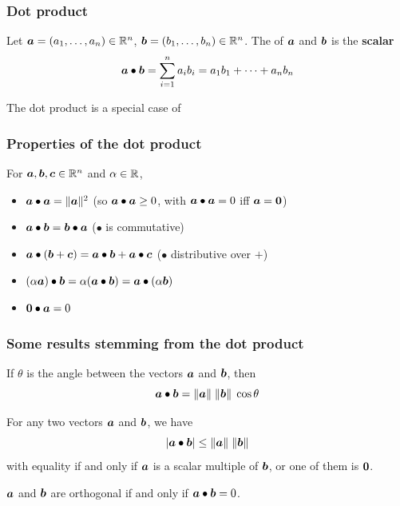 \documentclass[aspectratio=169]{beamer}\usepackage[]{graphicx}\usepackage[]{xcolor}
\begin{document}
\begin{frame}
\frametitle{Dot product}
	\begin{importantdefinition}
		Let $\bm{a}=(a_1,\ldots,a_n)\in \mathbb{R}^n$, $\bm{b}=(b_1,\ldots,b_n)\in\mathbb{R}^n$. 
		The  of $\bm{a}$ and $\bm{b}$ is the \textbf{scalar}
		\[
		\bm{a}\bullet \bm{b}=\sum_{i=1}^n a_ib_i=a_1b_1+\cdots+a_nb_n
		\]
	\end{importantdefinition}
\vfill
The dot product is a special case of 
\end{frame}

\begin{frame}
\frametitle{Properties of the dot product}
	\begin{importanttheorem}
		For $\bm{a},\bm{b},\bm{c}\in \mathbb{R}^n$ and $\alpha\in\mathbb{R}$,
		\begin{itemize}
			\item $\bm{a}\bullet\bm{a}=\|\bm{a}\|^2$ \hfill (so $\bm{a}\bullet \bm{a}\geq 0$, with $\bm{a}\bullet \bm{a}=0$ iff $\ba=\b0$)
			\item $\bm{a}\bullet \bm{b}=\bm{b}\bullet \bm{a}$ \hfill ($\bullet$ is commutative)
			\item $\bm{a}\bullet(\bm{b}+\bm{c})=\bm{a}\bullet \bm{b}+\bm{a}\bullet \bm{c}$ \hfill ($\bullet$ distributive over $+$)
			\item $(\alpha \bm{a})\bullet \bm{b}=\alpha(\bm{a}\bullet \bm{b})=\bm{a}\bullet(\alpha \bm{b})$
			\item $\b0\bullet \ba=0$
		\end{itemize}
	\end{importanttheorem}
\end{frame}

\begin{frame}
\frametitle{Some results stemming from the dot product}
	\begin{theorem}
		If $\theta$ is the angle between the vectors $\bm{a}$ and $\bm{b}$, then
		\[
		\bm{a}\bullet \bm{b}=\|\bm{a}\|\;\|\bm{b}\|\;\cos\theta
		\]
	\end{theorem}
	\begin{corollary}
		For any two vectors $\bm{a}$ and $\bm{b}$, we have
		\[
		|\bm{a}\bullet \bm{b}|\leq \|\bm{a}\|\;\|\bm{b}\|
		\]
		with equality if and only if $\bm{a}$ is a scalar multiple of $\bm{b}$, or one of them is $\b0$.
	\end{corollary}
	\begin{theorem}
		$\bm{a}$ and $\bm{b}$ are orthogonal if and only if $\bm{a}\bullet \bm{b}=0$.
	\end{theorem}
\end{frame}
\end{document}
